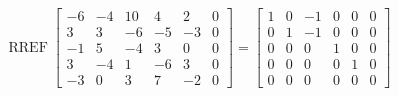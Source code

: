 \begin{exerciseAnswer} 


\[\operatorname{RREF} \left[\begin{array}{ccccc|c}
-6 & -4 & 10 & 4 & 2 & 0 \\
3 & 3 & -6 & -5 & -3 & 0 \\
-1 & 5 & -4 & 3 & 0 & 0 \\
3 & -4 & 1 & -6 & 3 & 0 \\
-3 & 0 & 3 & 7 & -2 & 0
\end{array}\right] = \left[\begin{array}{ccccc|c}
1 & 0 & -1 & 0 & 0 & 0 \\
0 & 1 & -1 & 0 & 0 & 0 \\
0 & 0 & 0 & 1 & 0 & 0 \\
0 & 0 & 0 & 0 & 1 & 0 \\
0 & 0 & 0 & 0 & 0 & 0
\end{array}\right] \]



\end{exerciseAnswer}
